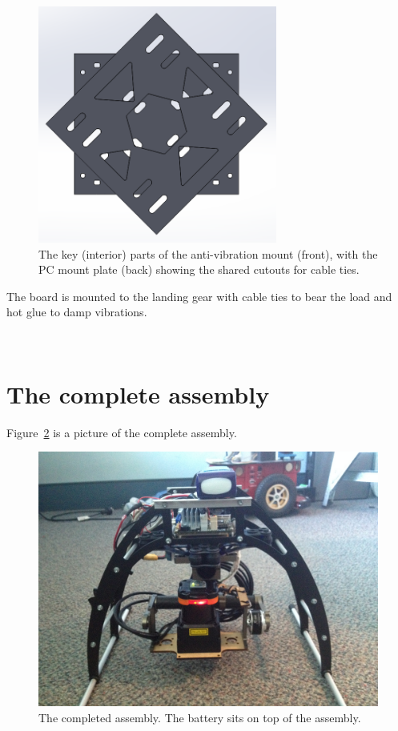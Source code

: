 \documentclass[12pt,oneside,a4paper]{book}
\begin{document}
\begin{figure}[h]
  \centering
  \includegraphics[width=0.7\textwidth]{figs/pc-avm}
  \caption{The key (interior) parts of the anti-vibration mount (front), with the PC mount plate (back) showing the shared cutouts for cable ties.}
  \label{fig:pc-avm-mount}
\end{figure}
The board is mounted to the landing gear with cable ties to bear the
load and hot glue to damp vibrations.

\newpage~\newpage
\section{The complete assembly}
\label{sec:concluding-remarks}

Figure~\ref{fig:mk2} is a picture of the complete assembly.

\begin{figure}[h!]
  \centering
  \includegraphics[width=\textwidth]{figs/mk2}
  \caption{The completed assembly. The battery sits on top of the assembly.}
  \label{fig:mk2}
\end{figure}
\end{document}
